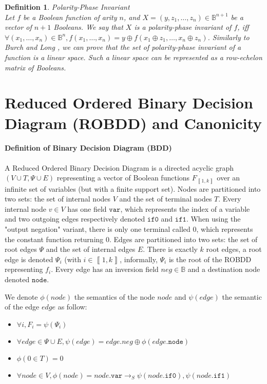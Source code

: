 \documentclass[a4paper,10pt]{article}
\newcommand{\shannon}[3]{{#1}\longrightarrow_S{#2}, {#3}}
\newcommand{\B}{\mathbb{B}}
\newcommand{\fieldVar}{\texttt{var}}
\newcommand{\fieldNode}{\texttt{node}}
\newcommand{\fieldThen}{\mathtt{if1}}
\newcommand{\fieldElse}{\mathtt{if0}}
\newcommand{\bras}[1]{{\left\llbracket{#1}\right\rrbracket}}
\newtheorem{newdef}{Definition}
\newcommand{\definition}[2]{\begin{newdef}{#1\\}#2\end{newdef}}
\begin{document}
\definition{Polarity-Phase Invariant}
{
Let $f$ be a Boolean function of arity $n$, and $X=(y, z_1, \dots, z_n)\in\B^{n+1}$ be a vector of $n+1$ Booleans.
We say that $X$ is a polarity-phase invariant of $f$, iff $\forall (x_1, \dots, x_n)\in\B^n, f(x_1, \dots, x_n) = y\oplus{}f(x_1\oplus{}z_1, \dots, x_n\oplus{}z_n)$.
Similarly to Burch and Long \cite{BurchLong1992}, we can prove that the set of polarity-phase invariant of a function is a linear space.
Such a linear space can be represented as a row-echelon matrix of Booleans.
}

\section{Reduced Ordered Binary Decision Diagram (ROBDD) and Canonicity}

\paragraph{Definition of Binary Decision Diagram (BDD)\\}

A Reduced Ordered Binary Decision Diagram is a directed acyclic graph $(V\cup T, \Psi \cup E)$ representing a vector of Boolean functions $F_\bras{1, k}$ over an infinite set of variables (but with a finite support set).
Nodes are partitioned into two sets: the set of internal nodes $V$ and the set of terminal nodes $T$.
Every internal node $v\in V$ has one field $\fieldVar{}$, which represents the index of a variable and two outgoing edges respectively denoted $\fieldElse{}$ and $\fieldThen{}$.
When using the "output negation" variant, there is only one terminal called 0, which represents the constant function returning 0.
Edges are partitioned into two sets: the set of root edges $\Psi$ and the set of internal edges $E$.
There is exactly $k$ root edges, a root edge is denoted $\Psi_i$ (with $i\in\bras{1, k}$, informally, $\Psi_i$ is the root of the ROBDD representing $f_i$.
Every edge has an inversion field $neg\in\B$ and a destination node denoted $\fieldNode{}$.


We denote $\phi(node)$ the semantics of the node $node$ and $\psi(edge)$ the semantic of the edge $edge$ as follow: \begin{itemize}
\item $\forall i, F_i = \psi(\Psi_i)$
\item $\forall edge \in \Psi \cup E, \psi(edge) = edge.neg \oplus \phi(edge.\fieldNode{})$
\item $\phi(0 \in T) = 0$
\item $\forall node \in V, \phi(node) = \shannon{node.\fieldVar{}}{\psi(node.\fieldElse{})}{\psi(node.\fieldThen{})}$
\end{itemize}
\end{document}
